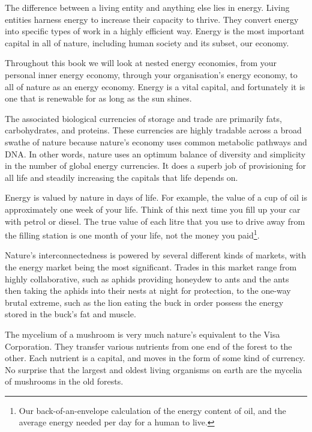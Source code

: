 The difference between a living entity and anything else lies in energy. Living entities harness energy to increase their capacity to thrive. They convert energy into specific types of work in a highly efficient way. Energy is the most important capital in all of nature, including human society and its subset, our economy.


Throughout this book we will look at nested energy economies, from your personal inner energy economy, through your organisation's energy economy, to all of nature as an energy economy. Energy is a vital capital, and fortunately it is one that is renewable for as long as the sun shines. 


The associated biological currencies of storage and trade are primarily fats, carbohydrates, and proteins. These currencies are highly tradable across a broad swathe of nature because nature's economy uses common metabolic pathways and DNA. In other words, nature uses an optimum balance of diversity and simplicity in the number of global energy currencies. It does a superb job of provisioning for all life and steadily increasing the capitals that life depends on. 


Energy is valued by nature in days of life. For example, the value of a cup of oil is approximately one week of your life. Think of this next time you fill up your car with petrol or diesel. The true value of each litre that you use to drive away from the filling station is one month of your life, not the money you paid\footnote{Our back-of-an-envelope calculation of the energy content of oil, and the average energy needed per day for a human to live.}.


Nature's interconnectedness is powered by several different kinds of markets, with the energy market being the most significant. Trades in this market range from highly collaborative, such as aphids providing honeydew to ants and the ants then taking the aphids into their nests at night for protection, to the one-way brutal extreme, such as the lion eating the buck in order possess the energy stored in the buck’s fat and muscle.


The mycelium of a mushroom is very much nature's equivalent to the Visa Corporation. They transfer various nutrients from one end of the forest to the other. Each nutrient is a capital, and moves in the form of some kind of currency. No surprise that the largest and oldest living organisms on earth are the mycelia of mushrooms in the old forests.


